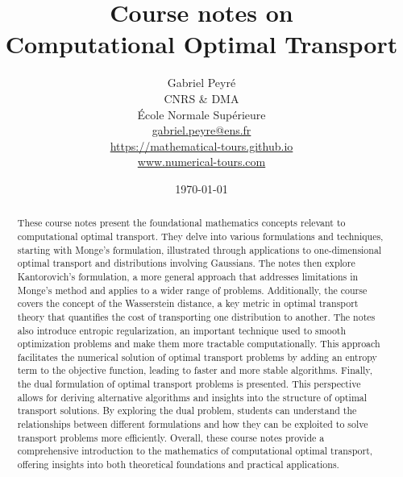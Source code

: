 \documentclass[10pt]{article}
\title{Course notes on\\ Computational Optimal Transport}
\author{%
\begin{tabular}{c}
	Gabriel Peyr{\'e} \\ CNRS \& DMA \\
	 \'Ecole Normale Sup\'erieure \\
	 \url{gabriel.peyre@ens.fr}\\
	 \url{https://mathematical-tours.github.io}\\
	 \url{www.numerical-tours.com}
\end{tabular}
}
\date{\today}
\begin{document}
\maketitle

\begin{abstract}
These course notes present the foundational mathematics concepts relevant to computational optimal transport. They delve into various formulations and techniques, starting with Monge's formulation, illustrated through applications to one-dimensional optimal transport and distributions involving Gaussians. The notes then explore Kantorovich's formulation, a more general approach that addresses limitations in Monge's method and applies to a wider range of problems.
%
Additionally, the course covers the concept of the Wasserstein distance, a key metric in optimal transport theory that quantifies the cost of transporting one distribution to another.
%
The notes also introduce entropic regularization, an important technique used to smooth optimization problems and make them more tractable computationally. This approach facilitates the numerical solution of optimal transport problems by adding an entropy term to the objective function, leading to faster and more stable algorithms.
%
Finally, the dual formulation of optimal transport problems is presented. This perspective allows for deriving alternative algorithms and insights into the structure of optimal transport solutions. By exploring the dual problem, students can understand the relationships between different formulations and how they can be exploited to solve transport problems more efficiently.
%
Overall, these course notes provide a comprehensive introduction to the mathematics of computational optimal transport, offering insights into both theoretical foundations and practical applications.
\end{abstract}










%
%
%
%






\end{document}
